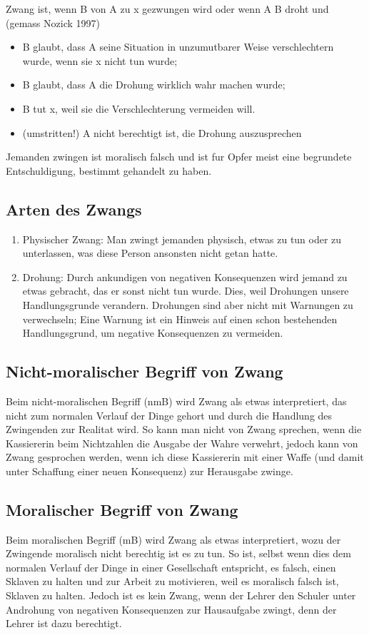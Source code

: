 \documentclass[../main.tex]{subfiles}
\begin{document}
\begin{warningbox}
Zwang ist, wenn B von A zu x gezwungen wird oder wenn A B droht und (gemass Nozick 1997)
\begin{itemize}
	\item B glaubt, dass A seine Situation in unzumutbarer Weise verschlechtern wurde, wenn sie x nicht tun wurde;
	\item B glaubt, dass A die Drohung wirklich wahr machen  wurde;
	\item B tut x, weil sie die Verschlechterung vermeiden will.
	\item (umstritten!) A nicht berechtigt ist, die Drohung auszusprechen
\end{itemize}
\end{warningbox}


Jemanden zwingen ist moralisch falsch und ist fur Opfer meist eine begrundete Entschuldigung, bestimmt gehandelt zu haben. 

\subsection{Arten des Zwangs}
\begin{enumerate}
	\item Physischer Zwang: Man zwingt jemanden physisch, etwas zu tun oder zu unterlassen, was diese Person ansonsten nicht getan hatte.
	\item Drohung: Durch ankundigen von negativen Konsequenzen wird jemand zu etwas gebracht, das er sonst nicht tun wurde. Dies, weil Drohungen unsere Handlungsgrunde verandern. Drohungen sind aber nicht mit Warnungen zu verwechseln; Eine Warnung ist ein Hinweis auf einen schon bestehenden Handlungsgrund, um negative Konsequenzen zu vermeiden. 
\end{enumerate}

\subsection{Nicht-moralischer Begriff von Zwang}
Beim nicht-moralischen Begriff (nmB) wird Zwang als etwas interpretiert, das nicht zum normalen Verlauf der Dinge gehort und durch die Handlung des Zwingenden zur Realitat wird. So kann man nicht von Zwang sprechen, wenn die Kassiererin beim Nichtzahlen die Ausgabe der Wahre verwehrt, jedoch kann von Zwang gesprochen werden, wenn ich diese Kassiererin mit einer Waffe (und damit unter Schaffung einer neuen Konsequenz) zur Herausgabe zwinge. 

\subsection{Moralischer Begriff von Zwang}
Beim moralischen Begriff (mB) wird Zwang als etwas interpretiert, wozu der Zwingende moralisch nicht berechtig ist es zu tun. So ist, selbst wenn dies dem normalen Verlauf der Dinge in einer Gesellschaft entspricht, es falsch, einen Sklaven zu halten und zur Arbeit zu motivieren, weil es moralisch falsch ist, Sklaven zu halten. Jedoch ist es kein Zwang, wenn der Lehrer den Schuler unter Androhung von negativen Konsequenzen zur Hausaufgabe zwingt, denn der Lehrer ist dazu berechtigt.
\end{document}
